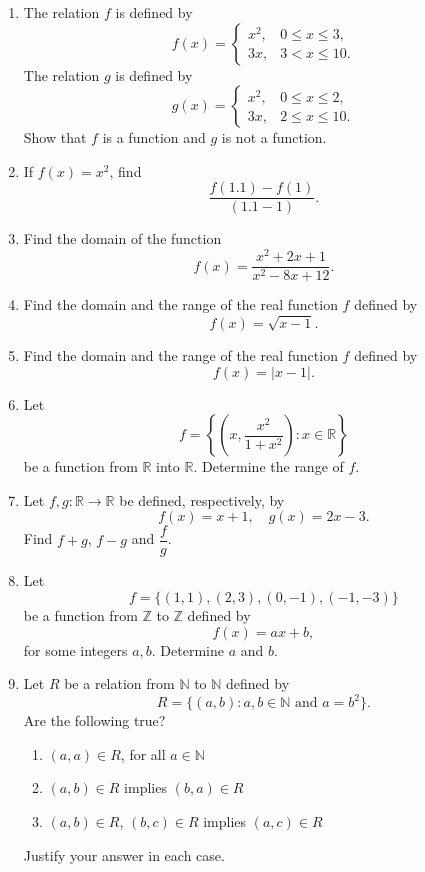\documentclass[11pt]{article}
\begin{document}
\begin{enumerate}

\item The relation $f$ is defined by
\[
f(x)=
\begin{cases}
x^2, & 0 \le x \le 3,\\
3x, & 3 < x \le 10.
\end{cases}
\]
The relation $g$ is defined by
\[
g(x)=
\begin{cases}
x^2, & 0 \le x \le 2,\\
3x, & 2 \le x \le 10.
\end{cases}
\]
Show that $f$ is a function and $g$ is not a function.

\item If $f(x)=x^2$, find
\[
\frac{f(1.1)-f(1)}{(1.1-1)}.
\]

\item Find the domain of the function
\[
f(x)=\frac{x^2+2x+1}{x^2-8x+12}.
\]

\item Find the domain and the range of the real function $f$ defined by
\[
f(x)=\sqrt{x-1}.
\]

\item Find the domain and the range of the real function $f$ defined by
\[
f(x)=|x-1|.
\]

\item Let
\[
f=\left\{\left(x,\frac{x^2}{1+x^2}\right):x\in \mathbb{R}\right\}
\]
be a function from $\mathbb{R}$ into $\mathbb{R}$. Determine the range of $f$.

\item Let $f,g:\mathbb{R}\to\mathbb{R}$ be defined, respectively, by
\[
f(x)=x+1,\quad g(x)=2x-3.
\]
Find $f+g$, $f-g$ and $\dfrac{f}{g}$.

\item Let
\[
f=\{(1,1),(2,3),(0,-1),(-1,-3)\}
\]
be a function from $\mathbb{Z}$ to $\mathbb{Z}$ defined by
\[
f(x)=ax+b,
\]
for some integers $a,b$. Determine $a$ and $b$.

\item Let $R$ be a relation from $\mathbb{N}$ to $\mathbb{N}$ defined by
\[
R=\{(a,b):a,b\in\mathbb{N}\text{ and }a=b^2\}.
\]
Are the following true?
\begin{enumerate}
\item $(a,a)\in R$, for all $a\in\mathbb{N}$
\item $(a,b)\in R$ implies $(b,a)\in R$
\item $(a,b)\in R$, $(b,c)\in R$ implies $(a,c)\in R$
\end{enumerate}
Justify your answer in each case.


\end{enumerate}
\end{document}
